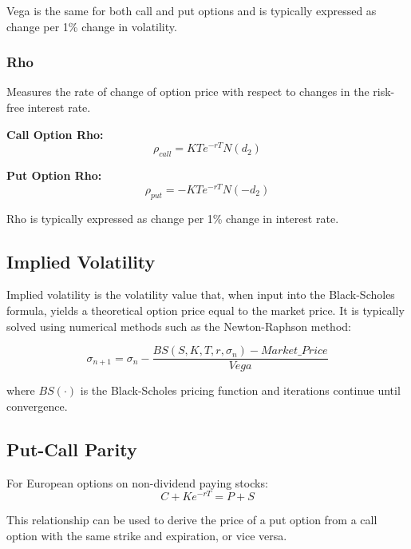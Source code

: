 \documentclass{article}
\begin{document}
Vega is the same for both call and put options and is typically expressed as change per 1\% change in volatility.

\subsubsection{Rho}
Measures the rate of change of option price with respect to changes in the risk-free interest rate.

\textbf{Call Option Rho:}
\begin{equation}
\rho_{call} = KTe^{-rT}N(d_2)
\end{equation}

\textbf{Put Option Rho:}
\begin{equation}
\rho_{put} = -KTe^{-rT}N(-d_2)
\end{equation}

Rho is typically expressed as change per 1\% change in interest rate.

\subsection{Implied Volatility}
Implied volatility is the volatility value that, when input into the Black-Scholes formula, yields a theoretical option price equal to the market price. It is typically solved using numerical methods such as the Newton-Raphson method:

\begin{equation}
\sigma_{n+1} = \sigma_n - \frac{BS(S, K, T, r, \sigma_n) - Market\_Price}{Vega}
\end{equation}

where $BS(\cdot)$ is the Black-Scholes pricing function and iterations continue until convergence.

\subsection{Put-Call Parity}
For European options on non-dividend paying stocks:
\begin{equation}
C + Ke^{-rT} = P + S
\end{equation}

This relationship can be used to derive the price of a put option from a call option with the same strike and expiration, or vice versa.



\end{document}
